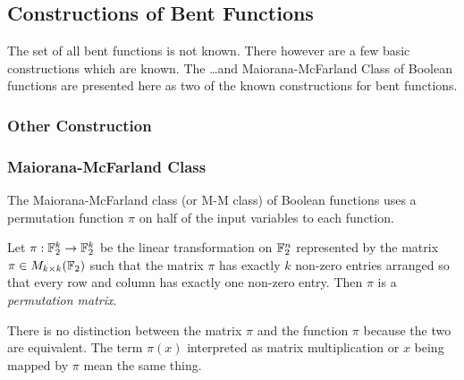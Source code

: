 
\subsection{Constructions of Bent Functions}\label{subsec:bent-constructions}
\par The set of all bent functions is not known. There however are a few basic
constructions which are known. The \dots and Maiorana-McFarland Class of Boolean
functions are presented here as two of the known constructions for bent
functions.
\subsubsection{Other Construction}
\subsubsection{Maiorana-McFarland Class}
\par The Maiorana-McFarland class (or M-M class) of Boolean functions uses a
permutation function $\pi$ on half of the input variables to each function.

\begin{definition}
  Let $\pi:\mathbb{F}_2^k\rightarrow\mathbb{F}_2^k$ be the linear transformation on
	$\mathbb{F}_2^n$ represented by the matrix $\pi\in M_{k\times k}(\mathbb{F}_2)$ such that the
  matrix $\pi$ has exactly $k$ non-zero entries arranged so that every row
  and column has exactly one non-zero entry. Then $\pi$ is a
  {\it permutation matrix}.
\end{definition}

\par There is no distinction between the matrix $\pi$ and the function $\pi$
because the two are equivalent. The term $\pi(x)$ interpreted as matrix
multiplication or $x$ being mapped by $\pi$ mean the same thing.

